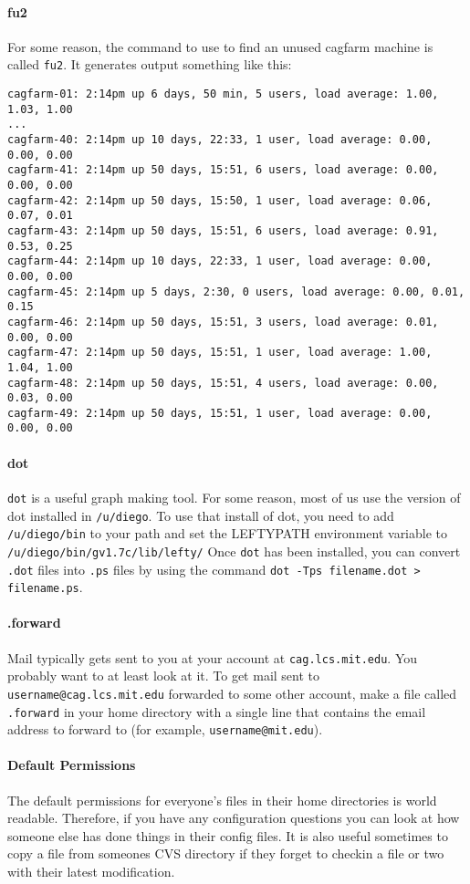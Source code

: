 \paragraph{fu2}
For some reason, the command to use to find an unused cagfarm machine
is called {\tt fu2}. It generates output something like this:
\begin{verbatim}
cagfarm-01: 2:14pm up 6 days, 50 min, 5 users, load average: 1.00, 1.03, 1.00
...
cagfarm-40: 2:14pm up 10 days, 22:33, 1 user, load average: 0.00, 0.00, 0.00
cagfarm-41: 2:14pm up 50 days, 15:51, 6 users, load average: 0.00, 0.00, 0.00
cagfarm-42: 2:14pm up 50 days, 15:50, 1 user, load average: 0.06, 0.07, 0.01
cagfarm-43: 2:14pm up 50 days, 15:51, 6 users, load average: 0.91, 0.53, 0.25
cagfarm-44: 2:14pm up 10 days, 22:33, 1 user, load average: 0.00, 0.00, 0.00
cagfarm-45: 2:14pm up 5 days, 2:30, 0 users, load average: 0.00, 0.01, 0.15
cagfarm-46: 2:14pm up 50 days, 15:51, 3 users, load average: 0.01, 0.00, 0.00
cagfarm-47: 2:14pm up 50 days, 15:51, 1 user, load average: 1.00, 1.04, 1.00
cagfarm-48: 2:14pm up 50 days, 15:51, 4 users, load average: 0.00, 0.03, 0.00
cagfarm-49: 2:14pm up 50 days, 15:51, 1 user, load average: 0.00, 0.00, 0.00
\end{verbatim}

\paragraph{dot}
{\tt dot} is a useful graph making tool. For some reason, most of us use
the version of dot installed in {\tt /u/diego}. To use that install
of dot, you need to add {\tt /u/diego/bin} to your path and set
the LEFTYPATH environment variable to {\tt /u/diego/bin/gv1.7c/lib/lefty/}
Once {\tt dot}
has been installed, you can convert {\tt .dot} files into {\tt .ps}
files by using the command {\tt dot -Tps filename.dot > filename.ps}.

\paragraph{.forward}
Mail typically gets sent to you at your account at {\tt cag.lcs.mit.edu}. 
You probably want to
at least look at it. To get mail sent to {\tt username@cag.lcs.mit.edu}
forwarded to some other account, make a file called {\tt .forward}
in your home directory with a single line that contains the email address
to forward to (for example, {\tt username@mit.edu}).

\paragraph{Default Permissions}
The default permissions for everyone's files in their home directories
is world readable. Therefore, if you have any configuration questions 
you can look at how someone else has done things in their config files.
It is also useful sometimes to copy a file from someones
CVS directory if they forget to checkin a file or two with their
latest modification.

